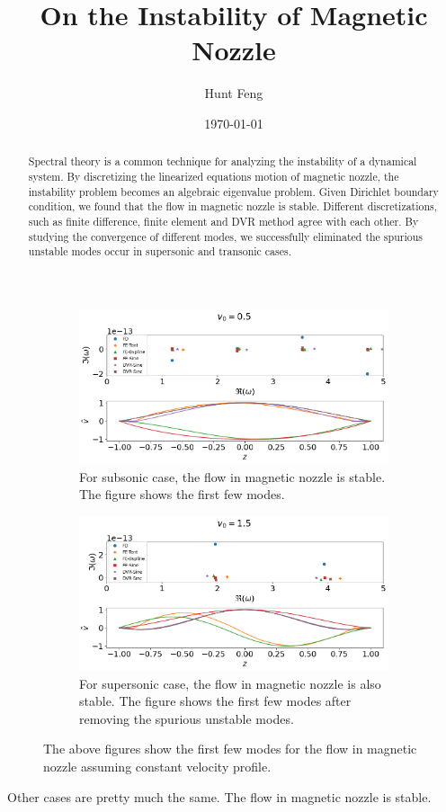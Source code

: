 \documentclass{article}
\title{On the Instability of Magnetic Nozzle}
\author{Hunt Feng}
\date{\today}
\begin{document}
    \maketitle
    \begin{abstract}
        Spectral theory is a common technique for analyzing the instability of a dynamical system. By discretizing the linearized equations motion of magnetic nozzle, the instability problem becomes an algebraic eigenvalue problem. Given Dirichlet boundary condition, we found that the flow in magnetic nozzle is stable. Different discretizations, such as finite difference, finite element and DVR method agree with each other. By studying the convergence of different modes, we successfully eliminated the spurious unstable modes occur in supersonic and transonic cases. 
    \end{abstract}
    

    \begin{figure}[H]
        \begin{subfigure}[b]{\textwidth}
            \centering
            \includegraphics[width=\textwidth]{img/constant-v-Mm=0.5.png}    
            \caption{For subsonic case, the flow in magnetic nozzle is stable. The figure shows the first few modes.}
        \end{subfigure}
        \begin{subfigure}[b]{\textwidth}
            \centering
            \includegraphics[width=\textwidth]{img/constant-v-Mm=1.5.png}
            \caption{For supersonic case, the flow in magnetic nozzle is also stable. The figure shows the first few modes after removing the spurious unstable modes.}
        \end{subfigure}
        \caption{The above figures show the first few modes for the flow in magnetic nozzle assuming constant velocity profile.}
    \end{figure}

    Other cases are pretty much the same. The flow in magnetic nozzle is stable.

    
    
    \nocite{smolyakov_quasineutral_2021}
\end{document}
